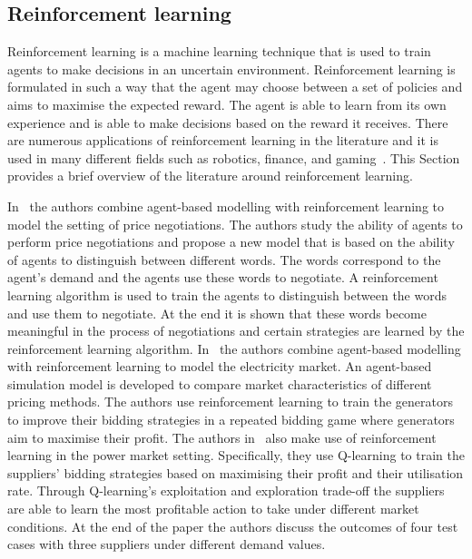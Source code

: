 \subsection{Reinforcement learning}

Reinforcement learning is a machine learning technique that is used to
train agents to make decisions in an uncertain environment.
Reinforcement learning is formulated in such a way that the agent may choose
between a set of policies and aims to maximise the expected reward.
The agent is able to learn from its own experience and is able to make
decisions based on the reward it receives.
There are numerous applications of reinforcement learning in the literature
and it is used in many different fields such as robotics, finance, and
gaming~\cite{sutton2018reinforcement}.
This Section provides a brief overview of the literature around reinforcement
learning.

In~\cite{Iizuka20001075} the authors combine agent-based modelling with
reinforcement learning to model the setting of price negotiations.
The authors study the ability of agents to perform price negotiations and
propose a new model that is based on the ability of agents to distinguish
between different words.
The words correspond to the agent's demand and the agents use these words to
negotiate.
A reinforcement learning algorithm is used to train the agents to distinguish
between the words and use them to negotiate.
At the end it is shown that these words become meaningful in the process of
negotiations and certain strategies are learned by the reinforcement learning
algorithm.
In~\cite{Zou20047} the authors combine agent-based modelling with reinforcement
learning to model the electricity market.
An agent-based simulation model is developed to compare market characteristics
of different pricing methods.
The authors use reinforcement learning to train the generators to improve their
bidding strategies in a repeated bidding game where generators aim to maximise
their profit.
The authors in~\cite{Tellidou2006228} also make use of reinforcement learning
in the power market setting.
Specifically, they use Q-learning to train the suppliers' bidding strategies
based on maximising their profit and their utilisation rate.
Through Q-learning's exploitation and exploration trade-off the suppliers are
able to learn the most profitable action to take under different market
conditions.
At the end of the paper the authors discuss the outcomes of four test cases
with three suppliers under different demand values.

